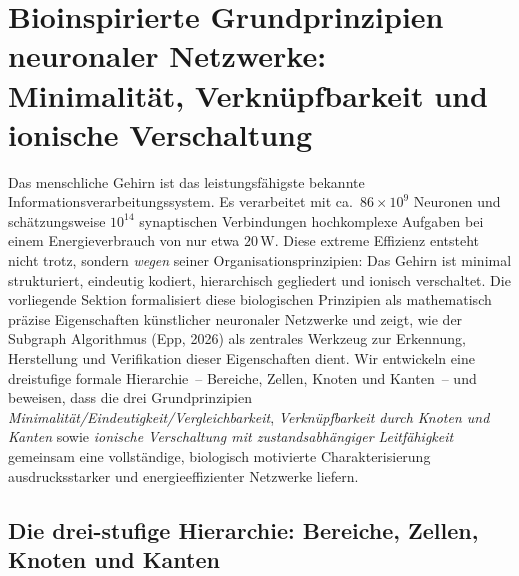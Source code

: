 ﻿\documentclass[12pt, a4paper, openany]{report}
\begin{document}
\chapter{Bioinspirierte Grundprinzipien neuronaler Netzwerke: Minimalität, Verknüpfbarkeit und ionische Verschaltung}
\label{sec:bioprinciples}

Das menschliche Gehirn ist das leistungsfähigste bekannte Informationsverarbeitungssystem.
Es verarbeitet mit ca.\ $86 \times 10^9$ Neuronen und schätzungsweise $10^{14}$
synaptischen Verbindungen hochkomplexe Aufgaben bei einem Energieverbrauch von
nur etwa $20\,\mathrm{W}$.  Diese extreme Effizienz entsteht nicht trotz,
sondern \emph{wegen} seiner Organisationsprinzipien: Das Gehirn ist minimal
strukturiert, eindeutig kodiert, hierarchisch gegliedert und ionisch
verschaltet.  Die vorliegende Sektion formalisiert diese biologischen
Prinzipien als mathematisch präzise Eigenschaften künstlicher neuronaler
Netzwerke und zeigt, wie der Subgraph Algorithmus (Epp, 2026) als zentrales
Werkzeug zur Erkennung, Herstellung und Verifikation dieser Eigenschaften
dient.  Wir entwickeln eine dreistufige formale Hierarchie~-- Bereiche,
Zellen, Knoten und Kanten~-- und beweisen, dass die drei Grundprinzipien
\emph{Minimalität/Eindeutigkeit/Vergleichbarkeit},
\emph{Verknüpfbarkeit durch Knoten und Kanten} sowie
\emph{ionische Verschaltung mit zustandsabhängiger Leitfähigkeit}
gemeinsam eine vollständige, biologisch motivierte Charakterisierung
ausdrucksstarker und energieeffizienter Netzwerke liefern.

\section{Die drei-stufige Hierarchie: Bereiche, Zellen, Knoten und Kanten}
\label{sec:bio_hierarchy}
\end{document}
